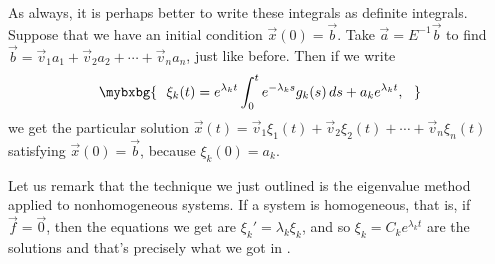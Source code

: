 \medskip

As always,
it is perhaps better to write these integrals as definite integrals.  
Suppose that we have an initial condition $\vec{x}(0) = \vec{b}$.
Take $\vec{a} = E^{-1} \vec{b}$ to find
$\vec{b} = \vec{v}_1 a_1 + \vec{v}_2 a_2 + \cdots + \vec{v}_n a_n$,
just like before.
Then if we write 
\begin{equation*}
\mybxbg{~~
\xi_k(t) =  e^{\lambda_k t} 
\int_0^t e^{-\lambda_k s} g_k(s) \,ds + a_k e^{\lambda_k t} ,
~~}
\end{equation*}
we get the particular solution
$\vec{x}(t) =
\vec{v}_1 \xi_1(t) + 
\vec{v}_2 \xi_2(t) + \cdots +
\vec{v}_n \xi_n(t)$ satisfying $\vec{x}(0) = \vec{b}$,
because $\xi_k(0) = a_k$.

Let us remark that the technique we just outlined is the eigenvalue
method applied to nonhomogeneous systems.  If a system is homogeneous, that
is, if $\vec{f}=\vec{0}$, then the equations we get are
$\xi_k' = \lambda_k \xi_k$, and so $\xi_k = C_k e^{\lambda_k t}$ are the
solutions and that's precisely what we got in
.

